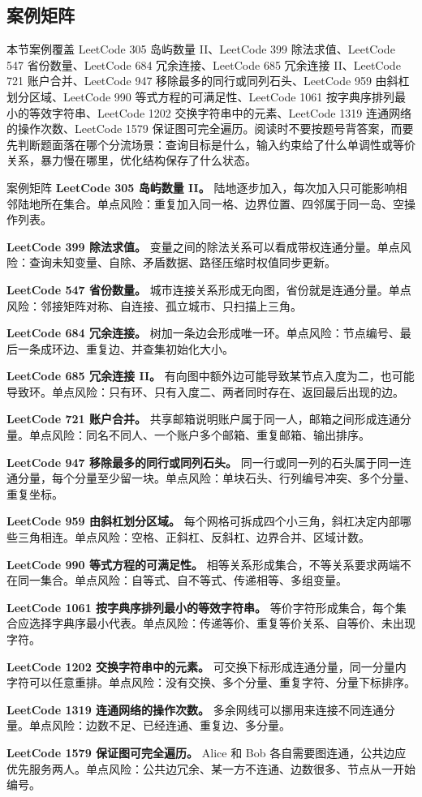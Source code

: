 \subsection{案例矩阵}

本节案例覆盖 LeetCode 305 岛屿数量 II、LeetCode 399 除法求值、LeetCode 547 省份数量、LeetCode 684 冗余连接、LeetCode 685 冗余连接 II、LeetCode 721 账户合并、LeetCode 947 移除最多的同行或同列石头、LeetCode 959 由斜杠划分区域、LeetCode 990 等式方程的可满足性、LeetCode 1061 按字典序排列最小的等效字符串、LeetCode 1202 交换字符串中的元素、LeetCode 1319 连通网络的操作次数、LeetCode 1579 保证图可完全遍历。阅读时不要按题号背答案，而要先判断题面落在哪个分流场景：查询目标是什么，输入约束给了什么单调性或等价关系，暴力慢在哪里，优化结构保存了什么状态。

\begin{principlebox}{案例矩阵}
\textbf{LeetCode 305 岛屿数量 II。}
陆地逐步加入，每次加入只可能影响相邻陆地所在集合。单点风险：重复加入同一格、边界位置、四邻属于同一岛、空操作列表。

\textbf{LeetCode 399 除法求值。}
变量之间的除法关系可以看成带权连通分量。单点风险：查询未知变量、自除、矛盾数据、路径压缩时权值同步更新。

\textbf{LeetCode 547 省份数量。}
城市连接关系形成无向图，省份就是连通分量。单点风险：邻接矩阵对称、自连接、孤立城市、只扫描上三角。

\textbf{LeetCode 684 冗余连接。}
树加一条边会形成唯一环。单点风险：节点编号、最后一条成环边、重复边、并查集初始化大小。

\textbf{LeetCode 685 冗余连接 II。}
有向图中额外边可能导致某节点入度为二，也可能导致环。单点风险：只有环、只有入度二、两者同时存在、返回最后出现的边。

\textbf{LeetCode 721 账户合并。}
共享邮箱说明账户属于同一人，邮箱之间形成连通分量。单点风险：同名不同人、一个账户多个邮箱、重复邮箱、输出排序。

\textbf{LeetCode 947 移除最多的同行或同列石头。}
同一行或同一列的石头属于同一连通分量，每个分量至少留一块。单点风险：单块石头、行列编号冲突、多个分量、重复坐标。

\textbf{LeetCode 959 由斜杠划分区域。}
每个网格可拆成四个小三角，斜杠决定内部哪些三角相连。单点风险：空格、正斜杠、反斜杠、边界合并、区域计数。

\textbf{LeetCode 990 等式方程的可满足性。}
相等关系形成集合，不等关系要求两端不在同一集合。单点风险：自等式、自不等式、传递相等、多组变量。

\textbf{LeetCode 1061 按字典序排列最小的等效字符串。}
等价字符形成集合，每个集合应选择字典序最小代表。单点风险：传递等价、重复等价关系、自等价、未出现字符。

\textbf{LeetCode 1202 交换字符串中的元素。}
可交换下标形成连通分量，同一分量内字符可以任意重排。单点风险：没有交换、多个分量、重复字符、分量下标排序。

\textbf{LeetCode 1319 连通网络的操作次数。}
多余网线可以挪用来连接不同连通分量。单点风险：边数不足、已经连通、重复边、多分量。

\textbf{LeetCode 1579 保证图可完全遍历。}
Alice 和 Bob 各自需要图连通，公共边应优先服务两人。单点风险：公共边冗余、某一方不连通、边数很多、节点从一开始编号。

\end{principlebox}

